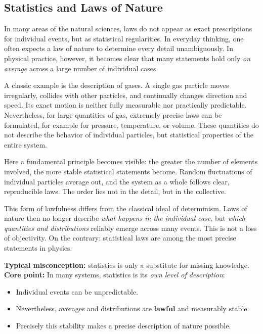 \subsection{Statistics and Laws of Nature}

In many areas of the natural sciences,
laws do not appear as exact prescriptions
for individual events,
but as statistical regularities.
In everyday thinking, one often expects
a law of nature to determine every detail unambiguously.
In physical practice, however, it becomes clear
that many statements hold only \emph{on average}
across a large number of individual cases.

A classic example is the description of gases.
A single gas particle moves irregularly,
collides with other particles,
and continually changes direction and speed.
Its exact motion
is neither fully measurable
nor practically predictable.
Nevertheless, for large quantities of gas,
extremely precise laws can be formulated,
for example for pressure, temperature, or volume.
These quantities do not describe the behavior of individual particles,
but statistical properties of the entire system.

Here a fundamental principle becomes visible:
the greater the number of elements involved,
the more stable statistical statements become.
Random fluctuations of individual particles
average out,
and the system as a whole
follows clear, reproducible laws.
The order lies not in the detail,
but in the collective.

This form of lawfulness
differs from the classical ideal of determinism.
Laws of nature then no longer describe
\emph{what happens in the individual case},
but \emph{which quantities and distributions}
reliably emerge across many events.
This is not a loss of objectivity.
On the contrary:
statistical laws are among
the most precise statements in physics.

\begin{DidacticBox}
	\label{box:statistics}
	\small
	\textbf{Typical misconception:} statistics is only a substitute for missing knowledge.\\
	\textbf{Core point:} In many systems, statistics is its \emph{own level of description}:
	\begin{itemize}
		\item Individual events can be unpredictable.
		\item Nevertheless, averages and distributions are \textbf{lawful} and measurably stable.
		\item Precisely this stability makes a precise description of nature possible.
	\end{itemize}
\end{DidacticBox}

